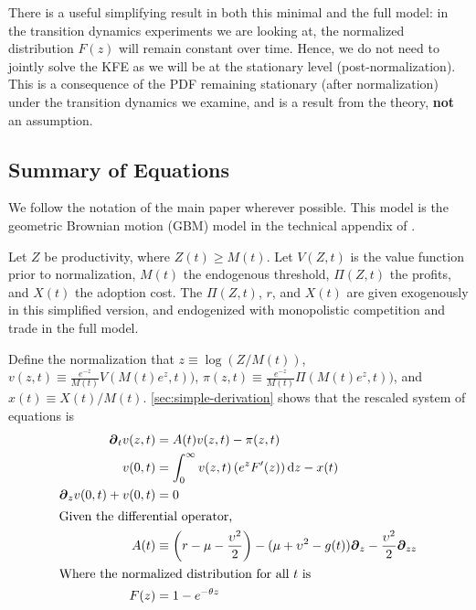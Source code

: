 \documentclass[11pt]{article}
\newcommand{\D}[1][]{\ensuremath{\boldsymbol{\partial}_{#1}}}
\newcommand{\diff}{\ensuremath{\mathrm{d}}}
\begin{document}
There is a useful simplifying result in both this minimal and the full model: in the transition dynamics experiments we are looking at, the normalized distribution $F(z)$ will remain constant over time.  Hence, we do not need to jointly solve the KFE as we will be at the stationary level (post-normalization).  This is a consequence of the PDF remaining stationary (after normalization) under the transition dynamics we examine, and is a result from the theory, \textbf{not} an assumption.

\subsection{Summary of Equations}\label{sec:summary-simple}
We follow the notation of the main paper wherever possible.  This model is the geometric Brownian motion (GBM) model in the technical appendix of \cite{BenhabibPerlaTonetti2017}.

Let $Z$ be productivity, where $Z(t) \geq M(t)$.  Let $V(Z,t)$ is the value function prior to normalization, $M(t)$ the endogenous threshold, $\Pi(Z,t)$ the profits, and $X(t)$ the adoption cost.  The $\Pi(Z,t)$, $r$, and $X(t)$ are given exogenously in this simplified version, and endogenized with monopolistic competition and trade in the full model.

Define the normalization that $z \equiv \log(Z/M(t))$, $v(z,t) \equiv \frac{e^{-z}}{M(t)}V(M(t)e^z, t))$, $\pi(z,t) \equiv \frac{e^{-z}}{M(t)}\Pi(M(t)e^z, t))$, and $x(t) \equiv X(t)/M(t)$.  \cref{sec:simple-derivation} shows that the rescaled system of equations is
\begin{align}
\D[t]v(z,t) &= A(t)v(z,t) - \pi(z,t)\label{eq:simple-summary1}\\
v(0,t) &= \int_{0}^{\infty}  v(z,t) \left(e^z F'(z)\right) \diff z - x(t)\label{eq:simple-summary2}\\
\D[z]v(0,t) + v(0,t) &= 0\label{eq:simple-summary3}\\
\intertext{Given the differential operator,}
A(t) &\equiv \left(r - \mu - \frac{\upsilon^2}{2}\right) - (\mu+ \upsilon^2 - g(t)) \D[z] - \frac{\upsilon^2}{2} \D[zz]\label{eq:simple-summary4}\\
\intertext{Where the normalized distribution for all $t$ is}
F(z) &= 1 - e^{-\theta z}
\end{align}
\end{document}
